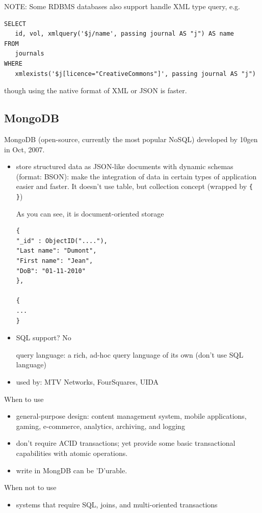 NOTE: Some RDBMS databases also support handle XML type query, e.g.
\begin{verbatim}
SELECT
   id, vol, xmlquery('$j/name', passing journal AS "j") AS name
FROM
   journals
WHERE 
   xmlexists('$j[licence="CreativeCommons"]', passing journal AS "j")
\end{verbatim}
though using the native format of XML or JSON is faster.

\subsection{MongoDB}
\label{sec:MongoDB}

MongoDB (open-source, currently the most popular NoSQL) developed by 10gen in
Oct, 2007.
\begin{itemize}
  \item store structured data as JSON-like documents with dynamic schemas
  (format: BSON): make the integration of data in certain types of application
  easier and faster. It doesn't use table, but collection concept (wrapped by
  \verb!{  }!)
  
  As you can see, it is document-oriented storage
  \begin{verbatim}
{
"_id" : ObjectID("...."),
"Last name": "Dumont",
"First name": "Jean",
"DoB": "01-11-2010"
},

{
...
}
  \end{verbatim}
  
  \item SQL support? No
  
  query language: a rich, ad-hoc query language of its own
  (don't use SQL language)
  
  \item used by: MTV Networks, FourSquares, UIDA
\end{itemize}

When to use
\begin{itemize}
  \item general-purpose design: content management system, mobile applications,
  gaming, e-commerce, analytics, archiving, and logging
  
  \item don't require ACID transactions; yet provide some basic transactional
  capabilities with atomic operations.
  
  \item write in MongDB can be 'D'urable.
\end{itemize}

When not to use
\begin{itemize}
  \item systems that require SQL, joins, and multi-oriented transactions
\end{itemize}

